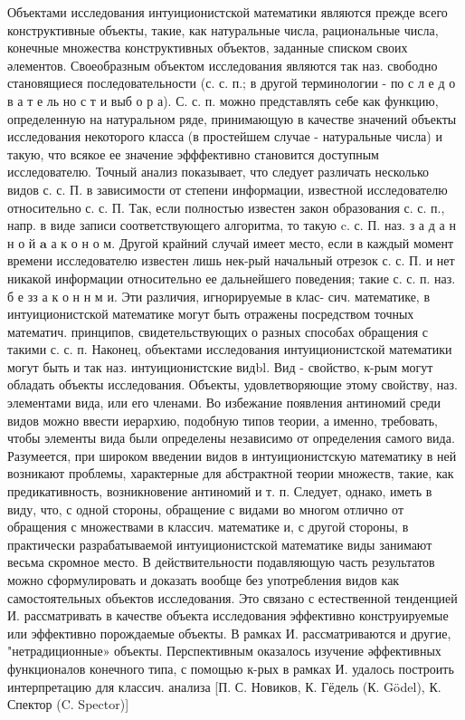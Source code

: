 \documentclass[10pt]{article}
\begin{document}
Объектами исследования интуиционистской математики являются прежде всего конструктивные объекты, такие, как натуральные числа, рациональные числа, конечные множества конструктивных объектов, заданные списком своих әлементов. Своеобразным объектом исследования являются так наз. свободно становящиеся последовательности (с. с. п.; в другой терминологии - по с л е д о в а т е ль но с т и выб о р а). С. с. п. можно представлять себе как функцию, определенную на натуральном ряде, принимающую в качестве значений объекты исследования некоторого класса (в простейшем случае - натуральные числа) и такую, что всякое ее значение эфффективно становится доступным исследователю. Точный анализ показывает, что следует различать несколько видов с. с. П. в зависимости от степени информации, известной исследователю относительно с. с. П. Так, если полностью известен закон образования с. с. п., напр. в виде записи соответствующего алгоритма, то такую c. с. П. наз. з а д а н н о й $\mathbf{a}$ а к о н о м. Другой крайний случай имеет место, если в каждый момент времени исследователю известен лишь нек-рый начальный отрезок с. с. П. и нет никакой информации относительно ее дальнейшего поведения; такие с. с. п. наз. б е зз а к о н н м и. Эти различия, игнорируемые в клас- сич. математике, в интуиционистской математике могут быть отражены посредством точных математич. принципов, свидетельствующих о разных способах обращения с такими с. с. п. Наконец, объектами исследования интуиционистской математики могут быть и так наз. интуиционистские видbl. Вид - свойство, к-рым могут обладать объекты исследования. Объекты, удовлетворяющие этому свойству, наз. элементами вида, или его членами. Во избежание появления антиномий среди видов можно ввести иерархию, подобную типов теории, а именно, требовать, чтобы элементы вида были определены независимо от определения самого вида. Разумеется, при широком введении видов в интуиционистскую математику в ней возникают проблемы, характерные для абстрактной теории множеств, такие, как предикативность, возникновение антиномий и т. п. Следует, однако, иметь в виду, что, с одной стороны, обращение с видами во многом отлично от обращения с множествами в классич. математике и, с другой стороны, в практически разрабатываемой интуиционистской математике виды занимают весьма скромное место. В действительности подавляющую часть результатов можно сформулировать и доказать вообще без употребления видов как самостоятельных объектов исследования. Это связано с естественной тенденцией И. рассматривать в качестве объекта исследования эффективно конструируемые или эффективно порождаемые объекты. В рамках И. рассматриваются и другие, "нетрадиционные» объекты. Перспективным оказалось изучение әффективных функционалов конечного типа, с помощью к-рых в рамках И. удалось построить интерпретацию для классич. анализа [П. С. Новиков, К. Гёдель (К. Gödel), К. Спектор (C. Spector)]
\end{document}
